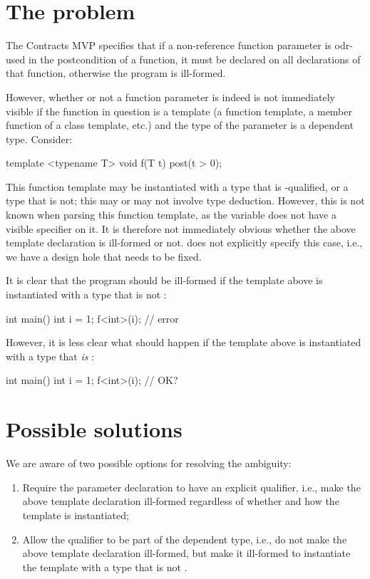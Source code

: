 \section{The problem}

The Contracts MVP \cite{P2900R10} specifies that if a non-reference function parameter is odr-used in the postcondition of a function, it must be declared  on all declarations of that function, otherwise the program is ill-formed.

However, whether or not a function parameter is indeed  is not immediately visible if the function in question is a template (a function template, a member function of a class template, etc.) and the type of the parameter is a dependent type. Consider:
\begin{codeblock}
template <typename T> 
void f(T t) post(t > 0); 
\end{codeblock}
This function template may be instantiated with a type that is -qualified, or a type that is not; this may or may not involve type deduction. However, this is not known when parsing this function template, as the variable  does not have a visible  specifier on it. It is therefore not immediately obvious whether the above template declaration is ill-formed or not. \cite{P2900R10} does not explicitly specify this case, i.e., we have a design hole that needs to be fixed.

It is clear that the program should be ill-formed if the template above is instantiated with a type  that is not :
\begin{codeblock}
int main() {
  int i = 1;
  f<int>(i);  // error
}
\end{codeblock}
However, it is less clear what should happen if the template above is instantiated with a type  that \emph{is} :
\begin{codeblock}
int main() {
  int i = 1;
  f<int>(i);  // OK?
}
\end{codeblock}

\section{Possible solutions}

We are aware of two possible options for resolving the ambiguity:
\begin{enumerate}
\item Require the parameter declaration to have an explicit  qualifier, i.e., make the above template declaration ill-formed regardless of whether and how the template is instantiated;
\item Allow the  qualifier to be part of the dependent type, i.e., do not make the above template declaration ill-formed, but make it ill-formed to instantiate the template with a type that is not .
\end{enumerate}

